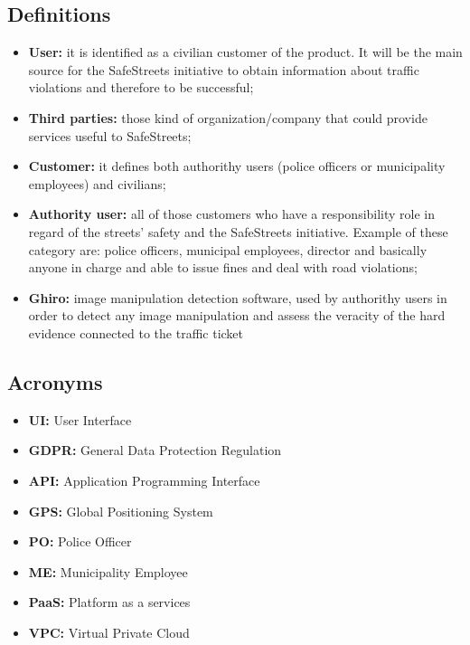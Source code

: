         \subsection{Definitions}
        \begin{itemize}            
            \item \textbf{User:} it is identified as a civilian customer of the
            product. It will be the main source for the SafeStreets initiative
            to obtain information about traffic violations and therefore to be
            successful;
            \item \textbf{Third parties:} those kind of organization/company that
            could provide services useful to SafeStreets; 
            \item \textbf{Customer:} it defines both authorithy users (police
            officers or municipality employees) and civilians; 
            \item \textbf{Authority user:} all of those customers who have a
            responsibility role in regard of the streets' safety and the
            SafeStreets initiative. Example of these category are: police
            officers, municipal employees, director and basically anyone in
            charge and able to issue fines and deal with road violations; 
            \item \textbf{Ghiro:} image manipulation detection software, used by
            authorithy users in order to detect any image manipulation and
            assess the veracity of the hard evidence connected to the traffic
            ticket\\
        \end{itemize}
        
        \subsection{Acronyms}
        \begin{itemize}
            \item \textbf{UI:} User Interface 
            \item \textbf{GDPR:} General Data Protection Regulation 
            \item \textbf{API:} Application Programming Interface
            \item \textbf{GPS:} Global Positioning System 
            \item \textbf{PO:} Police Officer 
            \item \textbf{ME:} Municipality Employee
            \item \textbf{PaaS:} Platform as a services
            \item \textbf{VPC:} Virtual Private Cloud
        \end{itemize}
    
